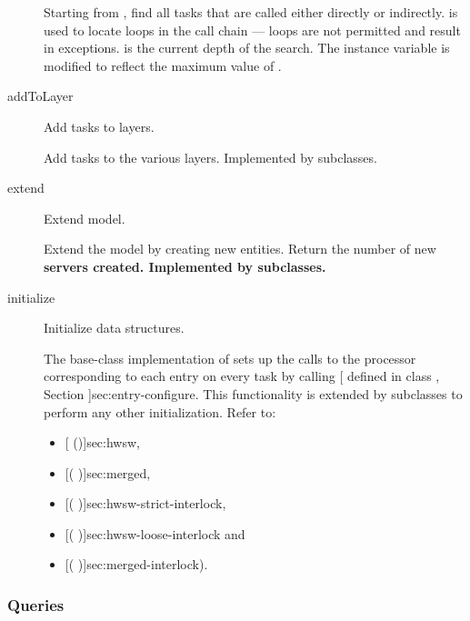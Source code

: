 \begin{description}
Starting from , find all tasks that are called either
directly or indirectly.   is used to locate loops in the
call chain --- loops are not permitted and result in exceptions.
 is the current depth of the search.  The instance variable
 is modified to reflect the
maximum value of .  

\label{sec:layerize-addToLayer}
\item[addToLayer] \texonly{---} Add tasks to layers.\\

Add tasks to the various layers.  Implemented by subclasses.

\label{sec:layerize-extend}
\item[extend] \texonly{---} Extend model.\\

Extend the model by creating new entities.  Return the number of new
\bf{servers} created.  Implemented by subclasses.

\label{sec:layerize-initialize}
\item[initialize] \texonly{---} Initialize data structures.\\

The base-class implementation of  sets up the calls
to the processor corresponding to each entry on every task by calling
[ defined in class , Section
\Ref]{sec:entry-configure}.  This functionality is extended by
subclasses to perform any other initialization.  Refer to:
\begin{itemize}
\item {}[ (\Sec\Ref)]{sec:hwsw},
\item {}[( \Sec\Ref)]{sec:merged},
\item {}[( \Sec\Ref)]{sec:hwsw-strict-interlock},
\item {}[( \Sec\Ref)]{sec:hwsw-loose-interlock} and
\item {}[( \Sec\Ref)]{sec:merged-interlock}).
\end{itemize}

\end{description}

\subsubsection{Queries}

